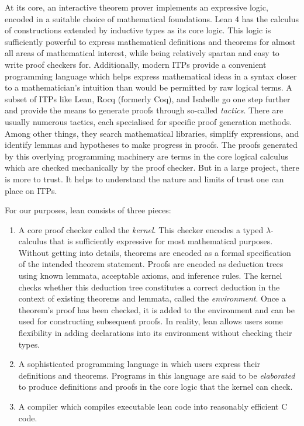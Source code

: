 At its core, an interactive theorem prover implements an expressive logic, encoded in a suitable choice of mathematical foundations. Lean 4 has the calculus of constructions extended by inductive types as its core logic. This logic is sufficiently powerful to express mathematical definitions and theorems for almost all areas of mathematical interest, while being relatively spartan and easy to write proof checkers for. Additionally, modern ITPs provide a convenient programming language which helps express mathematical ideas in a syntax closer to a mathematician's intuition than would be permitted by raw logical terms. A subset of ITPs like Lean, Rocq (formerly Coq), and Isabelle go one step further and provide the means to generate proofs through so-called \emph{tactics}. There are usually numerous tactics, each specialised for specific proof generation methods. Among other things, they search mathematical libraries, simplify expressions, and identify lemmas and hypotheses to make progress in proofs. The proofs generated by this overlying programming machinery are terms in the core logical calculus which are checked mechanically by the proof checker. But in a large project, there is more to trust. It helps to understand the nature and limits of trust one can place on ITPs.

For our purposes, lean consists of three pieces:
\begin{enumerate}
    \item A core proof checker called the \emph{kernel}. This checker encodes a typed $\lambda$-calculus that is sufficiently expressive for most mathematical purposes. Without getting into details, theorems are encoded as a formal specification of the intended theorem statement. Proofs are encoded as deduction trees using known lemmata, acceptable axioms, and inference rules. The kernel checks whether this deduction tree constitutes a correct deduction in the context of existing theorems and lemmata, called the \emph{environment}. Once a theorem's proof has been checked, it is added to the environment and can be used for constructing subsequent proofs. In reality, lean allows users some flexibility in adding declarations into its environment without checking their types.
    \item A sophisticated programming language in which users express their definitions and theorems. Programs in this language are said to  be \emph{elaborated} to produce definitions and proofs in the core logic that the kernel can check.
    \item A compiler which compiles executable lean code into reasonably efficient C code.
\end{enumerate}

